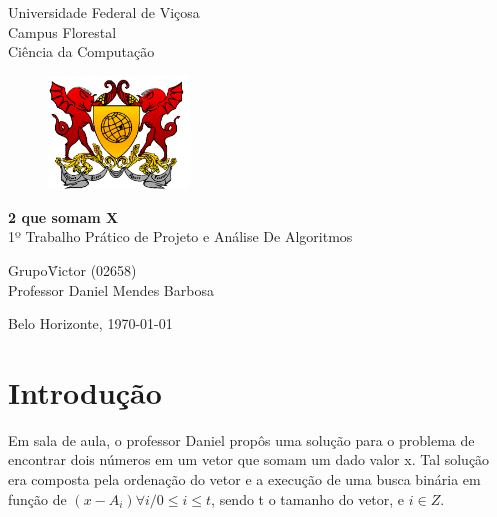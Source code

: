 \documentclass[12pt]{article}
\newcommand{\thecompany}{\huge Universidade Federal de Viçosa\\Campus Florestal\\Ciência da Computação}
\newcommand{\thelogo}{\begin{figure}[H] \centering \includegraphics[height=3cm]{BRASAOUFV.jpg} \end{figure}}
\newcommand{\thedate}{\today}
\newcommand{\thetitle}{\textbf{\LARGE 2 que somam X} \\ \large{1º Trabalho Prático de Projeto e Análise De Algoritmos}}
\newcommand{\theauthor}{Victor (02658)}
\begin{document}
	
\begin{titlepage}
	\begin{center}
		\thecompany
		
		\thelogo
		
		\vspace{10pt}
		
		
		\vspace{60pt}
		
		\thetitle
		
		\vspace{160pt}
		
	\end{center}
	
	\begin{flushleft}
		\begin{tabbing}
			Grupo\qquad\qquad\= \theauthor \\
			Professor\> Daniel Mendes Barbosa\\
			
		\end{tabbing}
		
	\end{flushleft}
	
	\begin{center}
		\vspace{\fill}
		Belo Horizonte, \thedate
	\end{center}
\end{titlepage}
	\thispagestyle{empty}
\tableofcontents
	\thispagestyle{empty}
	\clearpage
	\setcounter{page}{1}
	\begin{abstract}
		Nesse trabalho irei analisar o desempenho de diferentes algoritmos na tarefa de encontrar, em um vetor, dois números que somados resultam em um dado valor X. Por fim será proposta uma modificação no método de pesquisa em busca de um desempenho melhor.
	\end{abstract}
	{
	\begin{abstract}
	    This work is based on an analysis of different algorithms for finding two numbers in a vector whose sum is a given value X. Then i'll offer some changes in the searching method seeking better performance.
	\end{abstract}
	}
    \section{Introdução}\label{intro}
        Em sala de aula, o professor Daniel propôs uma solução para o problema de encontrar dois números em um vetor que somam um dado valor x. Tal solução era composta pela ordenação do vetor e a execução de uma busca binária em função de $(x-A_{i}) \forall i / 0 \leq i \leq t$, sendo t o tamanho do vetor, e $i \in Z$. 
        
\end{document}
